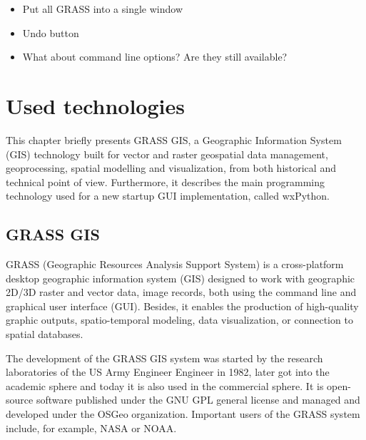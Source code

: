 \documentclass[a4paper,10pt,twoside]{article}
\begin{document}
\begin{itemize}
\item Put all GRASS into a single window
\end{itemize}

\begin{itemize}
\item Undo button
\end{itemize}

\begin{itemize}
\item What about command line options? Are they still available?
\end{itemize}

\newpage
\vspace*{-1cm}
\section{Used technologies}
\noindent
\large

\noindent This chapter briefly presents GRASS GIS, a Geographic Information System (GIS) technology built for vector and raster geospatial data management, geoprocessing, spatial modelling and visualization, from both historical and technical point of view. Furthermore, it describes the main programming technology used for a new startup GUI implementation, called wxPython.

\subsection{GRASS GIS}
\noindent
\large

\noindent GRASS (Geographic Resources Analysis Support System) is a cross-platform desktop geographic information system (GIS) designed to work with geographic 2D/3D raster and vector data, image records, both using the command line and graphical user interface (GUI). Besides, it enables the production of high-quality graphic outputs, spatio-temporal modeling, data visualization, or connection to spatial databases.

The development of the GRASS GIS system was started by the research laboratories of the US Army Engineer Engineer in 1982, later got into the academic sphere and today it is also used in the commercial sphere. It is open-source software published under the GNU GPL general license and managed and developed under the OSGeo organization. Important users of the GRASS system include, for example, NASA or NOAA.
\end{document}
